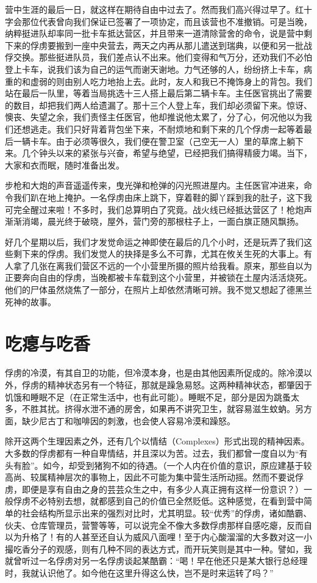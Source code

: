 \documentclass[11pt,oneside]{book}
\begin{document}
\begin{common-format}
营中生涯的最后一日，就这样在期待自由中过去了。然而我们高兴得过早了。红十字会那位代表曾向我们保证已签署了一项协定，而且该营也不准撤销。可是当晚，纳粹挺进队却率同一批卡车抵达营区，并且带来一道清除营舍的命令，说是营中剩下来的俘虏要搬到一座中央营去，两天之内再从那儿遣送到瑞典，以便和另一批战俘交换。那些挺进队员，我们差点认不出来。他们变得和气万分，还劝我们不必怕登上卡车，说我们该为自己的运气而谢天谢地。力气还够的人，纷纷挤上卡车，病重的和虚弱的则由别人吃力地抬上去。此时，友人和我已不掩饰身上的背包。我们站在最后一队里，等着当局挑选十三人搭上最后第二辆卡车。主任医官挑出了需要的数目，却把我们两人给遗漏了。那十三个人登上车，我们却必须留下来。惊讶、懊丧、失望之余，我们责怪主任医官，他却推说他太累了，分了心，何况他以为我们还想逃走。我们只好背着背包坐下来，不耐烦地和剩下来的几个俘虏一起等着最后一辆卡车。由于必须等很久，我们便在警卫室（己空无一人）里的草席上躺下来。几个钟头以来的紧张与兴奋，希望与绝望，已经把我们搞得精疲力竭。当下，大家和衣而眠，随时准备出发。

步枪和大炮的声音遥遥传来，曳光弹和枪弹的闪光照进屋内。主任医官冲进来，命令我们趴在地上掩护。一名俘虏由床上跳下，穿着鞋的脚丫踩到我的肚子，这下我可完全醒过来啦！不多时，我们总算明白了究竟。战火线已经抵达营区了！枪炮声渐渐消竭，晨光终于破晓，屋外，营门旁的那根柱子上，一面白旗正随风飘扬。

好几个星期以后，我们才发觉命运之神即使在最后的几个小时，还是玩弄了我们这些剩下来的俘虏。我们发觉人的抉择是多么不可靠，尤其在攸关生死的大事上。有人拿了几张在离我们营区不远的一个小营里所摄的照片给我看。原来，那些自以为正要奔向自由的俘虏，当晚都被卡车载到这个小营里，并被锁在土屋内活活烧死。他们的尸体虽然烧焦了一部分，在照片上却依然清晰可辨。我不觉又想起了德黑兰死神的故事。


\section{吃瘪与吃香}
俘虏的冷漠，有其自卫的功能，但冷漠本身，也是由其他因素所促成的。除冷漠以外，俘虏的精神状态另有一个特征，那就是躁急易怒。这两种精神状态，都肇因于饥饿和睡眠不足（在正常生活中，也有此可能）。睡眠不足，部分是因为跳蚤太多，不胜其扰。挤得水泄不通的房舍，如果再不讲究卫生，就容易滋生蚊蚋。另方面，缺少尼古丁和咖啡因的刺激，也会使人容易冷漠和躁怒。

除开这两个生理因素之外，还有几个以情结（Complexes）形式出现的精神因素。大多数的俘虏都有一种自卑情结，并且深以为苦。过去，我们都曾一度自以为“有头有脸”。如今，却受到猪狗不如的待遇。（一个人内在价值的意识，原应建基于较高尚、较属精神层次的事物上，因此不可能为集中营生活所动摇。然而不要说俘虏，即便是享有自由之身的芸芸众生之中，有多少人真正拥有这样一份意识？）一般俘虏不必特别去想，就都感到自己的价值已全然贬低。这种感觉，在看到营中简单的社会结构所显示出来的强烈对比时，尤其明显。较“优秀”的俘虏，诸如酷霸、伙夫、仓库管理员，营警等等，可以说完全不像大多数俘虏那样自感吃瘪，反而自以为升格了！有的人甚至还自认为威风八面哩！至于内心酸溜溜的大多数对这一小撮吃香分子的观感，则有几种不同的表达方式，而开玩笑则是其中一种。譬如，我就曾听过一名俘虏对另一名俘虏谈起某酷霸：“喝！早在他还只是某大银行总经理时，我就认识他了。如今他在这里升得这么快，岂不是时来运转了吗？”


\end{common-format}
\end{document}
